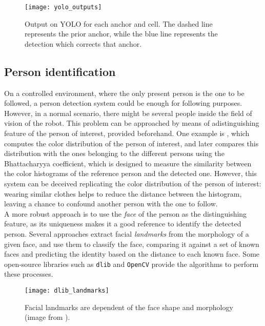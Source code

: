 \begin{figure}[h]
	\centering
	\texttt{[image: yolo\_outputs]}
	\caption{Output on YOLO for each anchor and cell. The dashed line represents the prior anchor, while the blue line represents the detection which corrects that anchor.}
	\label{fig:1_yolo_output}
\end{figure}

\subsection{Person identification}
On a controlled environment, where the only present person is the one to be followed, a person detection system could be enough for following purposes. However, in a normal scenario, there might be several people inside the field of vision of the robot. This problem can be approached by means of adistinguishing feature of the person of interest, provided beforehand. One example is \cite{color_id}, which computes the color distribution of the person of interest, and later compares this distribution with the ones belonging to the different persons using the Bhattacharyya coefficient, which is designed to measure the similarity between the color histograms of the reference person and the detected one. However, this system can be deceived replicating the color distribution of the person of interest: wearing similar clothes helps to reduce the distance between the histogram, leaving a chance to confound another person with the one to follow.\\

A more robust approach is to use the \textit{face} of the person as the distinguishing feature, as its uniqueness makes it a good reference to identify the detected person. Several approaches \cite{dlib_review} extract facial \textit{landmarks} from the morphology of a given face, and use them to classify the face, comparing it against a set of known faces and predicting the identity based on the distance to each known face. Some open-source libraries such as \texttt{dlib} and \texttt{OpenCV} provide the algorithms to perform these processes.\\

\begin{figure}[h]
	\centering
	\texttt{[image: dlib\_landmarks]}
	\caption{Facial landmarks are dependent of the face shape and morphology (image from \cite{dlib_review}).}
	\label{fig:1_dlib_landmarks}
\end{figure}


